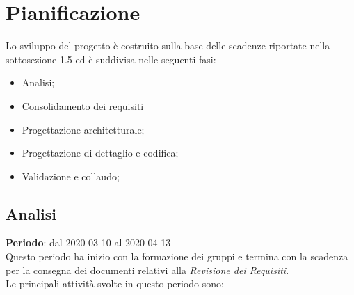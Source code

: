 \section{Pianificazione}
Lo sviluppo del progetto è costruito sulla base delle scadenze riportate nella sottosezione 1.5 ed è suddivisa nelle seguenti fasi:
\begin{itemize}
	\item Analisi;
	\item Consolidamento dei requisiti
	\item Progettazione architetturale;
	\item Progettazione di dettaglio e codifica;
	\item Validazione e collaudo;
\end{itemize}

\subsection{Analisi}
\textbf{Periodo}: dal 2020-03-10 al 2020-04-13 \\
Questo periodo ha inizio con la formazione dei gruppi e termina con la scadenza per la consegna dei documenti relativi alla \textit{Revisione dei Requisiti}. \\
Le principali attività svolte in questo periodo sono:
